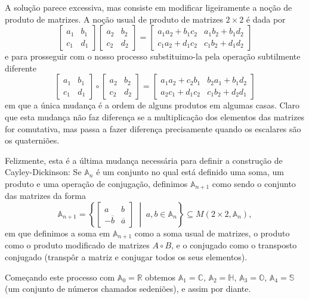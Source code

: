 \documentclass{article}
\newcommand{\R}{\mathbb{R}}
\newcommand{\C}{\mathbb{C}}
\renewcommand{\H}{\mathbb{H}}
\renewcommand{\O}{\mathbb{O}}
\begin{document}
A solução parece excessiva, mas consiste em modificar ligeiramente a noção de produto de matrizes. A noção usual de produto de matrizes $2 \times 2$ é dada por
\[\begin{bmatrix} a_1 & b_1 \\ c_1 & d_1 \end{bmatrix} \begin{bmatrix} a_2 & b_2 \\ c_2 & d_2 \end{bmatrix} = \begin{bmatrix} a_1 a_2 + b_1 c_2 & a_1 b_2 + b_1 d_2  \\ c_1 a_2 + d_1 c_2 & c_1 b_2 + d_1 d_2 \end{bmatrix}\]
e para prosseguir com o nosso processo substituimo-la pela operação subtilmente diferente
\[\begin{bmatrix} a_1 & b_1 \\ c_1 & d_1 \end{bmatrix} \circ \begin{bmatrix} a_2 & b_2 \\ c_2 & d_2 \end{bmatrix} = \begin{bmatrix} a_1 a_2 + c_2 b_1 & b_2 a_1 + b_1 d_2  \\ a_2 c_1 + d_1 c_2 & c_1 b_2 + d_2 d_1 \end{bmatrix}\]
em que a única mudança é a ordem de alguns produtos em algumas casas. Claro que esta mudança não faz diferença se a multiplicação dos elementos das matrizes for comutativa, mas passa a fazer diferença precisamente quando os escalares são os quaterniões.

Felizmente, esta é a última mudança necessária para definir a construção de Cayley-Dickinson: Se $\mathbb{A}_n$ é um conjunto no qual está definido uma soma, um produto e uma operação de conjugação, definimos $\mathbb{A}_{n+1}$ como sendo o conjunto das matrizes da forma
\[\mathbb{A}_{n+1} = \left\{ \begin{bmatrix} a & b \\ -\overline{b} & \overline{a} \end{bmatrix} \;\middle|\; a, b \in \mathbb{A}_n \right\} \subseteq M(2 \times 2, \mathbb{A}_n),\]
em que definimos a soma em $\mathbb{A}_{n+1}$ como a soma usual de matrizes, o produto como o produto modificado de matrizes $A \circ B$, e o conjugado como o transposto conjugado (transpôr a matriz e conjugar todos os seus elementos).

Começando este processo com $\mathbb{A}_0 = \R$ obtemos $\mathbb{A}_1 = \C$, $\mathbb{A}_2 = \H$, $\mathbb{A}_3 = \O$, $\mathbb{A}_4 = \mathbb{S}$ (um conjunto de números chamados sedeniões), e assim por diante.
\end{document}
